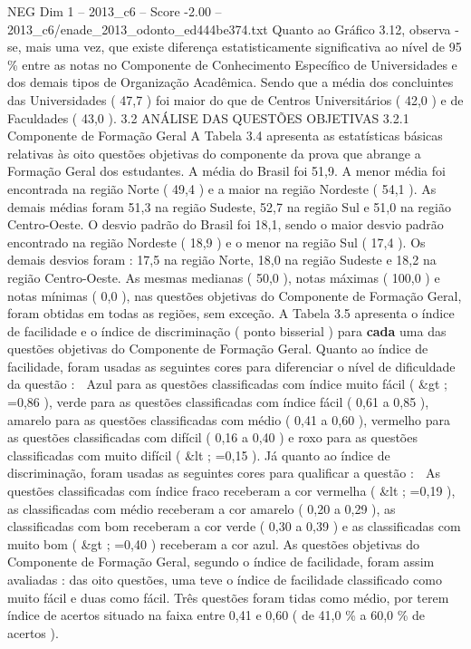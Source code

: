 \begin{textsample}{NEG Dim 1 – 2013\_c6 – Score -2.00 – 2013\_c6/enade\_2013\_odonto\_ed444be374.txt}
Quanto ao Gráfico 3.12, observa -se, mais uma vez, que existe diferença estatisticamente significativa ao nível de 95 \% entre as notas no Componente de Conhecimento Específico de Universidades e dos demais tipos de Organização Acadêmica.
Sendo que a média dos concluintes das Universidades ( 47,7 ) foi maior do que de Centros Universitários ( 42,0 ) e de Faculdades ( 43,0 ). 3.2 ANÁLISE DAS QUESTÕES OBJETIVAS 3.2.1 Componente de Formação Geral A Tabela 3.4 apresenta as estatísticas básicas relativas às oito questões objetivas do componente da prova que abrange a Formação Geral dos estudantes.
A média do Brasil foi 51,9.
A menor média foi encontrada na região Norte ( 49,4 ) e a maior na região Nordeste ( 54,1 ).
As demais médias foram 51,3 na região Sudeste, 52,7 na região Sul e 51,0 na região Centro-Oeste.
O desvio padrão do Brasil foi 18,1, sendo o maior desvio padrão encontrado na região Nordeste ( 18,9 ) e o menor na região Sul ( 17,4 ).
Os demais desvios foram : 17,5 na região Norte, 18,0 na região Sudeste e 18,2 na região Centro-Oeste.
As mesmas medianas ( 50,0 ), notas máximas ( 100,0 ) e notas mínimas ( 0,0 ), nas questões objetivas do Componente de Formação Geral, foram obtidas em todas as regiões, sem exceção.
A Tabela 3.5 apresenta o índice de facilidade e o índice de discriminação ( ponto bisserial ) para \textbf{cada} uma das questões objetivas do Componente de Formação Geral.
Quanto ao índice de facilidade, foram usadas as seguintes cores para diferenciar o nível de dificuldade da questão :  Azul para as questões classificadas com índice muito fácil ( \&gt ; =0,86 ), verde para as questões classificadas com índice fácil ( 0,61 a 0,85 ), amarelo para as questões classificadas com médio ( 0,41 a 0,60 ), vermelho para as questões classificadas com difícil ( 0,16 a 0,40 ) e roxo para as questões classificadas com muito difícil ( \&lt ; =0,15 ).
Já quanto ao índice de discriminação, foram usadas as seguintes cores para qualificar a questão :  As questões classificadas com índice fraco receberam a cor vermelha ( \&lt ; =0,19 ), as classificadas com médio receberam a cor amarelo ( 0,20 a 0,29 ), as classificadas com bom receberam a cor verde ( 0,30 a 0,39 ) e as classificadas com muito bom ( \&gt ; =0,40 ) receberam a cor azul.
As questões objetivas do Componente de Formação Geral, segundo o índice de facilidade, foram assim avaliadas : das oito questões, uma teve o índice de facilidade classificado como muito fácil e duas como fácil.
Três questões foram tidas como médio, por terem índice de acertos situado na faixa entre 0,41 e 0,60 ( de 41,0 \% a 60,0 \% de acertos ).

\end{textsample}
